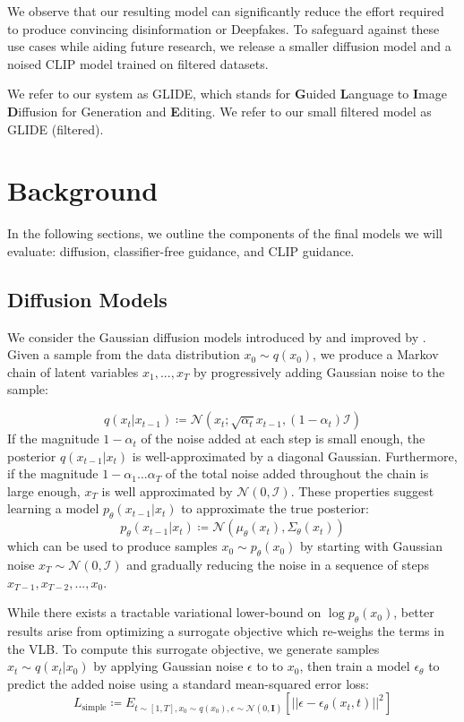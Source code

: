 We observe that our resulting model can significantly reduce the effort required to produce convincing disinformation or Deepfakes. To safeguard against these use cases while aiding future research, we release a smaller diffusion model and a noised CLIP model trained on filtered datasets.

We refer to our system as GLIDE, which stands for \textbf{G}uided \textbf{L}anguage to \textbf{I}mage \textbf{D}iffusion for Generation and \textbf{E}diting. We refer to our small filtered model as GLIDE (filtered).

\section{Background}
\label{sec:background}

In the following sections, we outline the components of the final models we will evaluate: diffusion, classifier-free guidance, and CLIP guidance.

\subsection{Diffusion Models}
\label{sec:diffusionbackground}

We consider the Gaussian diffusion models introduced by \citet{dickstein} and improved by \citet{scorematching,ddpm}. Given a sample from the data distribution $x_0 \sim q(x_0)$, we produce a Markov chain of latent variables $x_1, ..., x_T$ by progressively adding Gaussian noise to the sample:

$$q(x_t | x_{t-1}) \coloneqq \mathcal{N}(x_t; \sqrt{\alpha_t} x_{t-1}, (1-\alpha_t)\mathcal{I})$$
If the magnitude $1-\alpha_t$ of the noise added at each step is small enough, the posterior $q(x_{t-1} | x_{t})$ is well-approximated by a diagonal Gaussian. Furthermore, if the magnitude $1 -\alpha_1 ... \alpha_T$ of the total noise added throughout the chain is large enough, $x_T$ is well approximated by $\mathcal{N}(0, \mathcal{I})$. These properties suggest learning a model $p_\theta(x_{t-1} | x_t)$ to approximate the true posterior:
$$p_{\theta}(x_{t-1}|x_t) \coloneqq \mathcal{N}(\mu_{\theta}(x_t), \Sigma_{\theta}(x_t))$$
which can be used to produce samples $x_0 \sim p_\theta(x_0)$ by starting with Gaussian noise $x_T \sim \mathcal{N}(0, \mathcal{I})$ and gradually reducing the noise in a sequence of steps $x_{T-1}, x_{T-2}, ..., x_0$.

While there exists a tractable variational lower-bound on $\log p_\theta(x_0)$, better results arise from optimizing a surrogate objective which re-weighs the terms in the VLB. To compute this surrogate objective, we generate samples $x_t \sim q(x_t | x_0)$ by applying Gaussian noise $\epsilon$ to to $x_0$, then train a model $\epsilon_{\theta}$ to predict the added noise using a standard mean-squared error loss:
$$L_{\text{simple}} \coloneqq E_{t \sim [1,T],x_0 \sim q(x_0), \epsilon \sim \mathcal{N}(0, \mathbf{I})}[||\epsilon - \epsilon_{\theta}(x_t, t)||^2] \label{eq:lsimple}$$

